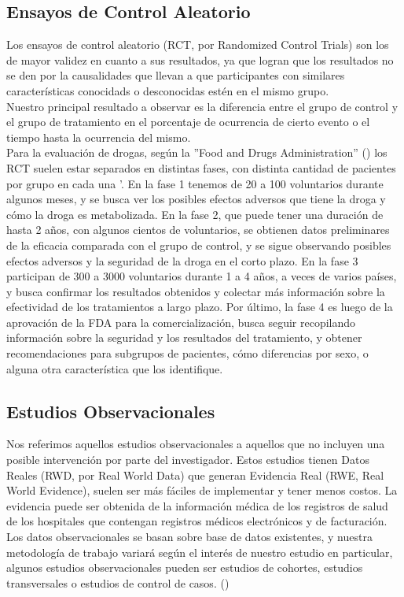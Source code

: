 \documentclass[12pt]{article}
\begin{document}
\subsection{Ensayos de Control Aleatorio}

Los ensayos de control aleatorio (RCT, por Randomized Control Trials) son los de mayor validez en cuanto a sus resultados, ya que logran que los resultados no se den por la causalidades que llevan a que participantes con similares características conocidads o desconocidas estén en el mismo grupo.\\
Nuestro principal resultado a observar es la diferencia entre el grupo de control y el grupo de tratamiento en el porcentaje de ocurrencia de cierto evento o el tiempo hasta la ocurrencia del mismo.\\

Para la evaluación de drogas, según la ''Food and Drugs Administration'' (\cite{alemayehu_statistical_2017})  los RCT suelen estar separados en distintas fases, con distinta cantidad de pacientes por grupo en cada una '.
En la fase 1 tenemos de 20 a 100 voluntarios durante algunos meses, y se busca ver los posibles efectos adversos que tiene la droga y cómo la droga es metabolizada. En la fase 2, que puede tener una duración de hasta 2 años, con algunos cientos de voluntarios, se obtienen datos preliminares de la eficacia comparada con el grupo de control, y se sigue observando posibles efectos adversos y la seguridad de la droga en el corto plazo.
En la fase 3 participan de 300 a 3000 voluntarios durante 1 a 4 años, a veces de varios países, y busca confirmar los resultados obtenidos y colectar más información sobre la efectividad de los tratamientos a largo plazo. Por último, la fase 4 es luego de la aprovación de la FDA para la comercialización, busca seguir recopilando información sobre la seguridad y los resultados del tratamiento, y obtener recomendaciones para subgrupos de pacientes, cómo diferencias por sexo, o alguna otra característica que los identifique.

\subsection{Estudios Observacionales}

Nos referimos aquellos estudios observacionales a aquellos que no incluyen una posible intervención por parte del investigador. Estos estudios tienen Datos Reales (RWD, por Real World Data) que generan Evidencia Real (RWE, Real World Evidence), suelen ser más fáciles de implementar y tener menos costos. La evidencia puede ser obtenida de la información médica de los registros de salud de los hospitales que contengan registros médicos electrónicos y de facturación.\\
Los datos observacionales se basan sobre base de datos existentes, y nuestra metodología de trabajo variará según el interés de nuestro estudio en particular, algunos estudios observacionales pueden ser estudios de cohortes, estudios transversales o estudios de control de casos. (\cite{alemayehu_statistical_2017})
\end{document}
